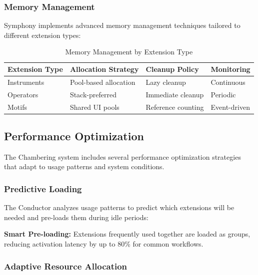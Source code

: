\subsubsection{Memory Management}
\label{subsubsec:memory-management}

Symphony implements advanced memory management techniques tailored to different extension types:

\begin{table}[h]
\centering
\caption{Memory Management by Extension Type}
\label{tab:memory-management}
\begin{tabular}{@{}llll@{}}
\toprule
\textbf{Extension Type} & \textbf{Allocation Strategy} & \textbf{Cleanup Policy} & \textbf{Monitoring} \\
\midrule
Instruments & Pool-based allocation & Lazy cleanup & Continuous \\
Operators & Stack-preferred & Immediate cleanup & Periodic \\
Motifs & Shared UI pools & Reference counting & Event-driven \\
\bottomrule
\end{tabular}
\end{table}

\subsection{Performance Optimization}
\label{subsec:performance-optimization}

The Chambering system includes several performance optimization strategies that adapt to usage patterns and system conditions.

\subsubsection{Predictive Loading}
\label{subsubsec:predictive-loading}

The Conductor analyzes usage patterns to predict which extensions will be needed and pre-loads them during idle periods:

\begin{successbox}
\textbf{Smart Pre-loading:} Extensions frequently used together are loaded as groups, reducing activation latency by up to 80\% for common workflows.
\end{successbox}

\subsubsection{Adaptive Resource Allocation}
\label{subsubsec:adaptive-resource-allocation}

